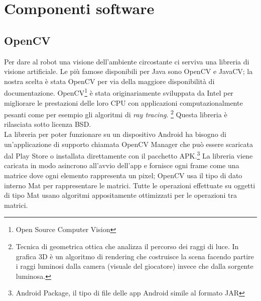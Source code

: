 \chapter{Componenti software}
\fancyfoot[C]{\thepage } 
\section {OpenCV}
Per dare al robot una visione dell'ambiente circostante ci serviva una libreria di 
visione artificiale. Le più famose disponibili per Java sono OpenCV e JavaCV; 
la nostra scelta è stata OpenCV per via della maggiore disponibilità di documentazione. 
OpenCV\footnote{Open Source Computer Vision} è stata originariamente sviluppata 
da Intel per migliorare le prestazioni delle loro CPU con applicazioni
computazionalmente pesanti come per esempio gli algoritmi di \textit{ray tracing}.
\footnote{Tecnica di geometrica ottica che analizza il percorso dei raggi di luce.
In grafica 3D è un algoritmo di rendering che costruisce la scena facendo
partire i raggi luminosi dalla camera (visuale del giocatore) invece che dalla 
sorgente luminosa.\cite{ray_tracing}} Questa libreria è rilasciata sotto licenza BSD. 
\\La libreria per poter funzionare su un 
dispositivo Android ha bisogno di un'applicazione di supporto chiamata OpenCV 
Manager che può essere scaricata dal Play Store o installata direttamente con il
pacchetto APK.\footnote{Android Package, il tipo di file delle app Android simile 
al formato JAR } La libreria viene caricata in modo asincrono all'avvio dell'app
e fornisce ogni frame come una matrice dove ogni elemento rappresenta un pixel; 
OpenCV usa il tipo di dato interno Mat per rappresentare le matrici.
Tutte le operazioni effettuate su oggetti di tipo Mat usano algoritmi appositamente 
ottimizzati per le operazioni tra matrici. 

